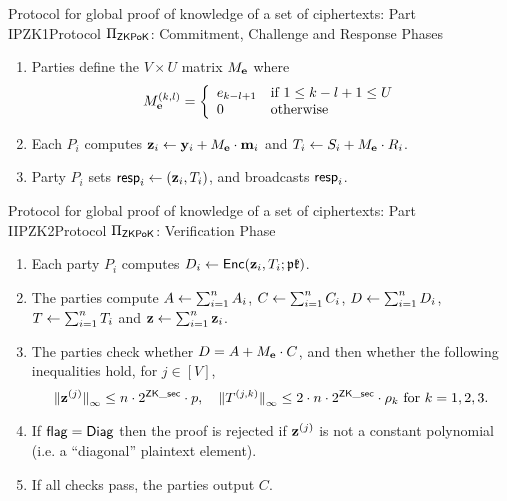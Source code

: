 \begin{Boxfig}{Protocol for global proof of knowledge of a set of ciphertexts: Part I}{PZK1}{Protocol $\Pi_{\mathsf{ZKPoK}}$: Commitment, Challenge and Response Phases}
\begin{enumerate}
\item Parties define the $V \times U$ matrix $M_{\mathbf{e}}$ where
\[
  M_{\mathbf{e}}^{(k,l)} = \left\{ \begin{array}{ll}
                 e_{k-l+1} & \textrm{if }1\leq k-l+1 \leq U\\
                 0 & \textrm{otherwise}
                     \end{array}
\right.
\]
\item Each $P_i$ computes $ \mathbf{z}_i \leftarrow \mathbf{y}_i + M_{\mathbf{e}} \cdot \mathbf{m}_i$
  and $T_i \leftarrow S_i + M_{\mathbf{e}} \cdot R_i$. 
\item Party $P_i$ sets $\mathsf{resp}_i \leftarrow \left( \mathbf{z}_i, T_i \right)$, and broadcasts $\mathsf{resp}_i$.
\end{enumerate}
\end{Boxfig}


\begin{Boxfig}{Protocol for global proof of knowledge of a set of ciphertexts: Part II}{PZK2}{Protocol $\Pi_{\mathsf{ZKPoK}}$: Verification Phase}

\begin{enumerate}
\item Each party $P_i$ computes $D_i \leftarrow \mathsf{Enc}( \mathbf{z}_i, T_i; \mathfrak{pk})$.
\item The parties compute
$A \leftarrow \sum_{i=1}^n A_i$,
$C \leftarrow \sum_{i=1}^n C_i$,
$D \leftarrow \sum_{i=1}^n D_i$,
$T \leftarrow \sum_{i=1}^n T_i$ and
$\mathbf{z} \leftarrow \sum_{i=1}^n \mathbf{z}_i$. 
\item The parties check whether $ D = A + M_{\mathbf{e}} \cdot C$, and then whether 
  the following inequalities hold, for $j \in [V]$,
\[
    {\Vert \mathbf{z}^{(j)} \Vert}_\infty \le n \cdot 2^{\mathsf{ZK\_sec}} \cdot p,
    \quad
    {\Vert T^{(j,k)} \Vert}_\infty \le 2 \cdot n \cdot 2^{\mathsf{ZK\_sec}} \cdot \rho_k \mbox{ for } k=1,2,3.
\]
\item If $\mathsf{flag}=\mathsf{Diag}$ then the proof is rejected if 
  $\mathbf{z}^{(j)}$ is not a constant polynomial (i.e. a ``diagonal'' plaintext element).
\item If all checks pass, the parties output $C$.
\end{enumerate}
\end{Boxfig}

